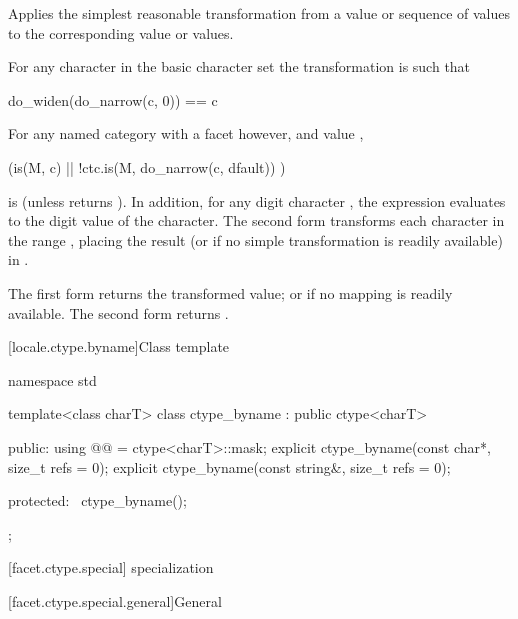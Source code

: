 \begin{itemdescr}
\pnum
\effects
Applies the simplest reasonable transformation
from a  value or sequence of  values
to the corresponding  value or values.

For any character  in the basic character set
the transformation is such that
\begin{codeblock}
do_widen(do_narrow(c, 0)) == c
\end{codeblock}

For any named  category with
a  facet  however, and
 value ,
\begin{codeblock}
(is(M, c) || !ctc.is(M, do_narrow(c, dfault)) )
\end{codeblock}
is  (unless  returns ).
In addition, for any digit character ,
the expression 
evaluates to the digit value of the character.
The second form transforms
each character  in the range ,
placing the result
(or  if no simple transformation is readily available)
in .

\pnum
\returns
The first form returns the transformed value;
or  if no mapping is readily available.
The second form returns .
\end{itemdescr}

[locale.ctype.byname]{Class template }

%
\begin{codeblock}
namespace std {
  template<class charT>
  class ctype_byname : public ctype<charT> {
  public:
    using @@ = ctype<charT>::mask;
    explicit ctype_byname(const char*, size_t refs = 0);
    explicit ctype_byname(const string&, size_t refs = 0);

  protected:
    ~ctype_byname();
  };
}
\end{codeblock}

[facet.ctype.special]{ specialization}

[facet.ctype.special.general]{General}

